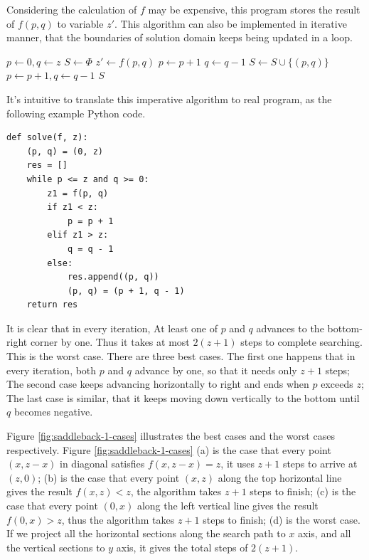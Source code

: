 \documentclass[UTF8]{article}
\begin{document}
Considering the calculation of $f$ may be expensive, this program stores the result of $f(p, q)$ to variable $z'$.
This algorithm can also be implemented in iterative manner, that the boundaries of solution domain keeps being updated
in a loop.

\begin{algorithmic}[1]
  \State $p \gets 0, q \gets z$
  \State $S \gets \Phi$
    \State $z' \gets f(p, q)$
      \State $p \gets p + 1$
      \State $q \gets q - 1$
    \Else
      \State $S \gets S \cup \{(p, q)\}$
      \State $p \gets p + 1, q \gets q - 1$
    \EndIf
  \EndWhile
  \State \Return $S$
\EndFunction
\end{algorithmic}

It's intuitive to translate this imperative algorithm to real program, as the following example Python code.

\lstset{language=Python}
\begin{lstlisting}
def solve(f, z):
    (p, q) = (0, z)
    res = []
    while p <= z and q >= 0:
        z1 = f(p, q)
        if z1 < z:
            p = p + 1
        elif z1 > z:
            q = q - 1
        else:
            res.append((p, q))
            (p, q) = (p + 1, q - 1)
    return res

\end{lstlisting}

It is clear that in every iteration, At least one of $p$ and $q$ advances to the bottom-right corner by one.
Thus it takes at most $2(z+1)$ steps to complete searching. This is the worst case. There are three best
cases. The first one happens that in every iteration, both $p$ and $q$ advance by one, so that it needs
only $z+1$ steps; The second case keeps advancing horizontally to right and ends when $p$ exceeds $z$;
The last case is similar, that it keeps moving down vertically to the bottom until $q$ becomes negative.

Figure \ref{fig:saddleback-1-cases} illustrates the best cases and the worst cases respectively. Figure
\ref{fig:saddleback-1-cases} (a) is the case that every point $(x, z-x)$ in diagonal satisfies $f(x, z-x) = z$,
it uses $z+1$ steps to arrive at $(z, 0)$; (b) is the case that every point $(x, z)$ along the top
horizontal line gives the result $f(x, z) < z$, the algorithm takes $z+1$ steps to finish; (c) is
the case that every point $(0, x)$ along the left vertical line gives the result $f(0, x) > z$, thus
the algorithm takes $z+1$ steps to finish; (d) is the worst case. If we project all the horizontal
sections along the search path to $x$ axis, and all the vertical sections to $y$ axis, it
gives the total steps of $2(z+1)$.
\end{document}
